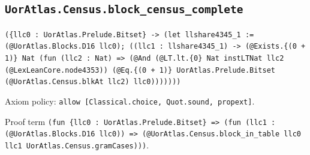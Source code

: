 \documentclass[11pt]{article}
\begin{document}
\subsection*{\texttt{UorAtlas.Census.block\_census\_complete}}
\noindent\texttt{(\{llc0 : UorAtlas.Prelude.Bitset\} -> (let llshare4345\_1 := (@UorAtlas.Blocks.D16 llc0); ((llc1 : llshare4345\_1) -> (@Exists.\{(0 + 1)\} Nat (fun (llc2 : Nat) => (@And (@LT.lt.\{0\} Nat instLTNat llc2 (@LexLeanCore.node4353)) (@Eq.\{(0 + 1)\} UorAtlas.Prelude.Bitset (@UorAtlas.Census.blkAt llc2) llc0)))))))}\par
\noindent Axiom policy: \texttt{allow [Classical.choice, Quot.sound, propext]}.\par
\noindent Proof term \texttt{(fun \{llc0 : UorAtlas.Prelude.Bitset\} => (fun (llc1 : (@UorAtlas.Blocks.D16 llc0)) => (@UorAtlas.Census.block\_in\_table llc0 llc1 UorAtlas.Census.gramCases)))}.\par
\end{document}
